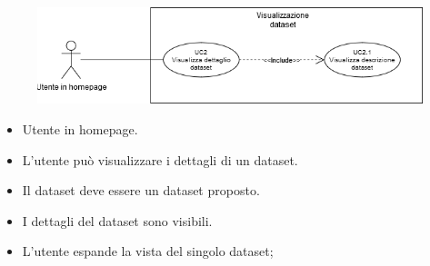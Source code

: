    \begin{figure}[h!]
        \centering
        \includegraphics[scale=0.6]{template/images/UC2.png}
        \caption{}
    \end{figure}
    \UCdsc
    { %
        \begin{itemize}
            \item Utente in homepage.
        \end{itemize}
    }
    { %
        \begin{itemize}
            \item  L'utente può visualizzare i dettagli di un dataset.
        \end{itemize}
    }
    { %
        \begin{itemize}
            \item Il dataset deve essere un dataset proposto.
        \end{itemize}
    }
    { %
        \begin{itemize}
            \item I dettagli del dataset sono visibili.
        \end{itemize}
    }
    { %
        \begin{itemize}
            \item L'utente espande la vista del singolo dataset;
        \end{itemize}
    }
    

